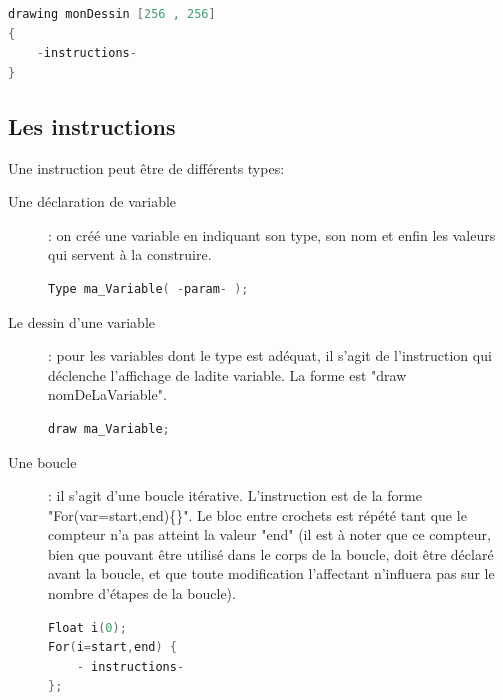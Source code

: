 \documentclass[11pt]{report} %
\begin{document}
\begin{lstlisting}[caption=Définition d'une image vectorielle, language=C]
drawing monDessin [256 , 256]
{
    -instructions-
}
\end{lstlisting}

\subsection{Les instructions}
Une instruction peut être de différents types:
\begin{description}

  \item[Une déclaration de variable]: on créé une variable en indiquant son type, son nom et enfin les valeurs qui servent à la construire.

\begin{minipage}{\linewidth}
\begin{lstlisting}[caption=Déclaration de variable, language=C]
Type ma_Variable( -param- );
\end{lstlisting}
\end{minipage}

  \item[Le dessin d'une variable]: pour les variables dont le type est adéquat, il s'agit de l'instruction qui déclenche l'affichage de ladite variable. La forme est "draw nomDeLaVariable".

\begin{minipage}{\linewidth}
\begin{lstlisting}[caption=Dessin d'une variable, language=C]
draw ma_Variable;
\end{lstlisting}
\end{minipage}




 \item[Une boucle]: il s'agit d'une boucle itérative. L'instruction est de la forme "For(var=start,end)\{\}". Le bloc entre crochets est répété tant que le compteur n'a pas atteint la valeur "end" (il est à noter que ce compteur, bien que pouvant être utilisé dans le corps de la boucle, doit être déclaré avant la boucle, et que toute modification l'affectant n'influera pas sur le nombre d'étapes de la boucle).

\begin{minipage}{\linewidth}
\begin{lstlisting}[caption=Boucle, language=C]
Float i(0);
For(i=start,end) {
	- instructions-
};
\end{lstlisting}
\end{minipage}


\end{description}
\end{document}
